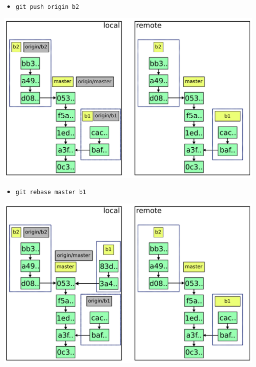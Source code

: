 \documentclass{beamer}
\begin{document}
\begin{frame}{}
  \begin{itemize}
  \item \lstinline|git push origin b2|
  \end{itemize}
\end{frame}

\begin{frame}{}
  \includegraphics[width=\textwidth]{img/4.pdf}
\end{frame}

\begin{frame}{}
  \begin{itemize}
  \item \lstinline|git rebase master b1|
  \end{itemize}
\end{frame}

\begin{frame}{}
  \includegraphics[width=\textwidth]{img/5.pdf}
\end{frame}
\end{document}
